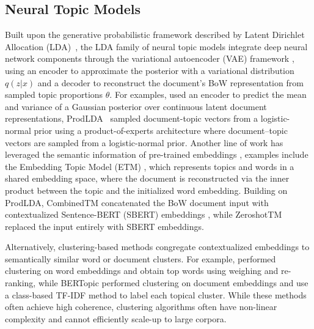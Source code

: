 \documentclass{article}
\theoremstyle{plain}
\theoremstyle{definition}
\theoremstyle{remark}
\begin{document}
\subsection{Neural Topic Models}
Built upon the generative probabilistic framework described by Latent Dirichlet Allocation (LDA)~\citep{blei2003latent}, the LDA family of neural topic models integrate deep neural network components through the variational autoencoder (VAE) framework \citep{kingma2014auto}, using an encoder to approximate the posterior with a variational distribution $q(z|x)$ and a decoder to reconstruct the document's BoW representation from sampled topic proportions $\theta$.
For examples, \citet{miao2017discovering} used an encoder to predict the mean and variance of a Gaussian posterior over continuous latent document representations, ProdLDA~\citep{srivastava2017autoencoding} sampled document-topic vectors from a logistic-normal prior using a product-of-experts architecture where document–topic vectors are sampled from a logistic-normal prior.
Another line of work has leveraged the semantic information of pre-trained embeddings \citep{fang-etal-2024-cwtm, abaskohi-etal-2025-cemtm}, examples include the Embedding Topic Model (ETM) \citep{dieng-etal-2020-topic}, which represents topics and words in a shared embedding space, where the document is reconstructed via the inner product between the topic and the initialized word embedding. Building on ProdLDA, CombinedTM \citep{bianchi-etal-2021-pre} concatenated the BoW document input with contextualized Sentence-BERT (SBERT) embeddings \citep{reimers-gurevych-2019-sentence}, while ZeroshotTM~\citep{bianchi-etal-2021-cross} replaced the input entirely with SBERT embeddings. 

Alternatively, clustering-based methods \citep{zhang-etal-2022-neural} congregate contextualized embeddings to semantically similar word or document clusters. For example, \citet{sia-etal-2020-tired} performed clustering on word embeddings and obtain top words using weighing and re-ranking, while BERTopic \citep{grootendorst2022bertopic} performed clustering on document embeddings and use a class-based TF-IDF method to label each topical cluster. While these methods often achieve high coherence, clustering algorithms often have non-linear complexity and cannot efficiently scale-up to large corpora. 
\end{document}

